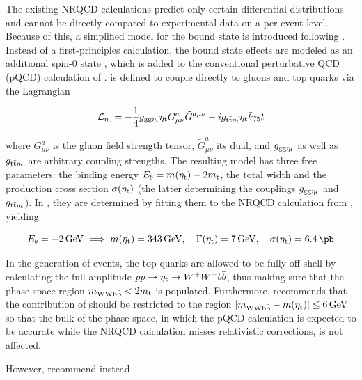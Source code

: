 The existing NRQCD calculations predict only certain differential distributions and cannot be directly compared to experimental data on a per-event level. Because of this, a simplified model for the \ttbar bound state is introduced following . Instead of a first-principles calculation, the bound state effects are modeled as an additional spin-0 state \etat, which is added to the conventional perturbative QCD (pQCD) calculation of \ttbar. \etat is defined to couple directly to gluons and top quarks via the Lagrangian

\begin{equation}
\label{eq:theory:etatlagrangian}
  \mathcal{L}_{\mathrm{\eta_t}} = - \frac{1}{4} g_{\mathrm{gg} \mathrm{\eta_t}} \mathrm{\eta_t} G^{a}_{\mu \nu} \tilde{G}^{a \mu \nu} - i g_{\mathrm{t \bar{t}} \mathrm{\eta_t}} \mathrm{\eta_t} \bar{t} \gamma_5 t
\end{equation}

\noindent where $G^{a}_{\mu \nu}$ is the gluon field strength tensor, $\tilde{G}^{a}_{\mu \nu}$ its dual, and $g_{\mathrm{gg} \mathrm{\eta_t}}$ as well as $g_{\mathrm{t \bar{t}} \mathrm{\eta_t}}$ are arbitrary coupling strengths. The resulting model has three free parameters: the binding energy $E_b = m(\mathrm{\eta_t}) - 2 m_{\mathrm{t}}$, the total width \Gammaetat and the production cross section $\sigma(\mathrm{\eta_t})$ (the latter determining the couplings $g_{\mathrm{gg} \mathrm{\eta_t}}$ and $g_{\mathrm{t \bar{t}} \mathrm{\eta_t}}$). In , they are determined by fitting them to the NRQCD calculation from , yielding

\begin{equation}
  \label{eq:theory:etatparams_7gev}
  E_b = \SI{-2}{\GeV} \implies \metat = \SI{343}{\GeV}, \quad \Gammaetat = \SI{7}{\GeV}, \quad \sigma(\etat) = \SI{6.4}{\pb}
\end{equation}

In the generation of events, the top quarks are allowed to be fully off-shell by calculating the full amplitude $p p \rightarrow \mathrm{\eta_t} \rightarrow W^+ W^- b \bar{b}$, thus making sure that the phase-space region $m_{\mathrm{WWb\bar{b}}} < 2 m_{\mathrm{t}}$ is populated. Furthermore,  recommends that the contribution of \etat should be restricted to the region $|m_{\mathrm{WWb\bar{b}}} - m(\mathrm{\eta_t})| \leq \SI{6}{GeV}$ so that the bulk of the \ttbar phase space, in which the pQCD calculation is expected to be accurate while the NRQCD calculation misses relativistic corrections, is not affected.

However,  recommend instead

